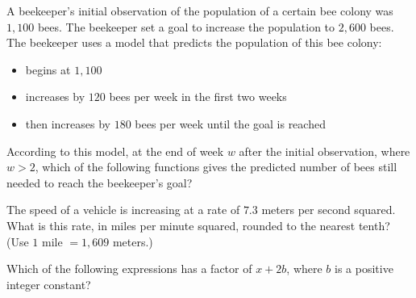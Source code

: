 \vspace{0.75em}


\vspace{2em}
\newpage

\noindent\markforreview
\vspace{1em}

A beekeeper's initial observation of the population of a certain bee colony was \(1{,}100\) bees. The beekeeper set a goal to increase the population to \(2{,}600\) bees.
The beekeeper uses a model that predicts the population of this bee colony:
\begin{itemize}
\item begins at \(1{,}100\)
\item increases by \(120\) bees per week in the first two weeks
\item then increases by \(180\) bees per week until the goal is reached
\end{itemize}
According to this model, at the end of week \(w\) after the initial observation, where \(w > 2\), which of the following functions gives the predicted number of bees still needed to reach the beekeeper's goal?

\vspace{0.75em}


\vspace{2em}
\newpage

\noindent\markforreview
\vspace{1em}

The speed of a vehicle is increasing at a rate of \(7.3\) meters per second squared. What is this rate, in miles per minute squared, rounded to the nearest tenth? (Use \(1\) mile \(= 1{,}609\) meters.)

\vspace{0.75em}


\vspace{2em}
\newpage

\noindent\markforreview
\vspace{1em}

Which of the following expressions has a factor of \(x + 2b\), where \(b\) is a positive integer constant?

